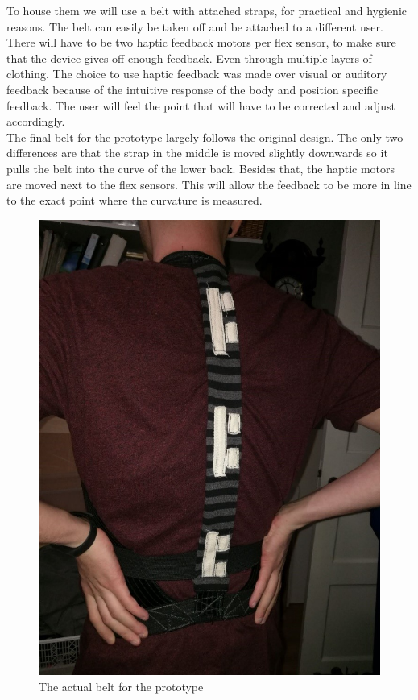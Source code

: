 \documentclass[sigconf]{acmart}
\begin{document}
To house them we will use a belt with attached straps, for practical and hygienic reasons. The belt can easily be taken off and be attached to a different user. There will have to be two haptic feedback motors per flex sensor, to make sure that the device gives off enough feedback. Even through multiple layers of clothing. The choice to use haptic feedback was made over visual or auditory feedback because of the intuitive response of the body and position specific feedback. The user will feel the point that will have to be corrected and adjust accordingly.\\




The final belt for the prototype largely follows the original design. The only two differences are that the strap in the middle is moved slightly downwards so it pulls the belt into the curve of the lower back. Besides that, the haptic motors are moved next to the flex sensors. This will allow the feedback to be more in line to the exact point where the curvature is measured.
\begin{figure}[h]
\centering
\includegraphics[scale=0.5]{Tom_Prototype.jpg}
\caption{The actual belt for the prototype}
\end{figure}
\end{document}
